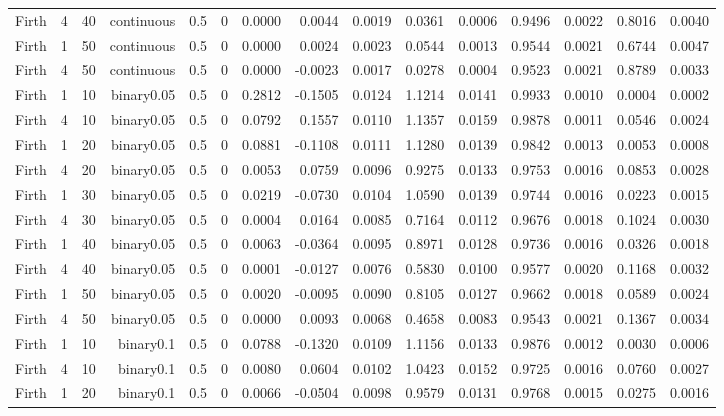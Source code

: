 \begin{longtable}{rrrrrrrrrrrrrrr}
  Firth & 4 & 40 & continuous & 0.5 & 0 & 0.0000 & 0.0044 & 0.0019 & 0.0361 & 0.0006 & 0.9496 & 0.0022 & 0.8016 & 0.0040 \\ 
  Firth & 1 & 50 & continuous & 0.5 & 0 & 0.0000 & 0.0024 & 0.0023 & 0.0544 & 0.0013 & 0.9544 & 0.0021 & 0.6744 & 0.0047 \\ 
  Firth & 4 & 50 & continuous & 0.5 & 0 & 0.0000 & -0.0023 & 0.0017 & 0.0278 & 0.0004 & 0.9523 & 0.0021 & 0.8789 & 0.0033 \\ 
  Firth & 1 & 10 & binary0.05 & 0.5 & 0 & 0.2812 & -0.1505 & 0.0124 & 1.1214 & 0.0141 & 0.9933 & 0.0010 & 0.0004 & 0.0002 \\ 
  Firth & 4 & 10 & binary0.05 & 0.5 & 0 & 0.0792 & 0.1557 & 0.0110 & 1.1357 & 0.0159 & 0.9878 & 0.0011 & 0.0546 & 0.0024 \\ 
  Firth & 1 & 20 & binary0.05 & 0.5 & 0 & 0.0881 & -0.1108 & 0.0111 & 1.1280 & 0.0139 & 0.9842 & 0.0013 & 0.0053 & 0.0008 \\ 
  Firth & 4 & 20 & binary0.05 & 0.5 & 0 & 0.0053 & 0.0759 & 0.0096 & 0.9275 & 0.0133 & 0.9753 & 0.0016 & 0.0853 & 0.0028 \\ 
  Firth & 1 & 30 & binary0.05 & 0.5 & 0 & 0.0219 & -0.0730 & 0.0104 & 1.0590 & 0.0139 & 0.9744 & 0.0016 & 0.0223 & 0.0015 \\ 
  Firth & 4 & 30 & binary0.05 & 0.5 & 0 & 0.0004 & 0.0164 & 0.0085 & 0.7164 & 0.0112 & 0.9676 & 0.0018 & 0.1024 & 0.0030 \\ 
  Firth & 1 & 40 & binary0.05 & 0.5 & 0 & 0.0063 & -0.0364 & 0.0095 & 0.8971 & 0.0128 & 0.9736 & 0.0016 & 0.0326 & 0.0018 \\ 
  Firth & 4 & 40 & binary0.05 & 0.5 & 0 & 0.0001 & -0.0127 & 0.0076 & 0.5830 & 0.0100 & 0.9577 & 0.0020 & 0.1168 & 0.0032 \\ 
  Firth & 1 & 50 & binary0.05 & 0.5 & 0 & 0.0020 & -0.0095 & 0.0090 & 0.8105 & 0.0127 & 0.9662 & 0.0018 & 0.0589 & 0.0024 \\ 
  Firth & 4 & 50 & binary0.05 & 0.5 & 0 & 0.0000 & 0.0093 & 0.0068 & 0.4658 & 0.0083 & 0.9543 & 0.0021 & 0.1367 & 0.0034 \\ 
  Firth & 1 & 10 & binary0.1 & 0.5 & 0 & 0.0788 & -0.1320 & 0.0109 & 1.1156 & 0.0133 & 0.9876 & 0.0012 & 0.0030 & 0.0006 \\ 
  Firth & 4 & 10 & binary0.1 & 0.5 & 0 & 0.0080 & 0.0604 & 0.0102 & 1.0423 & 0.0152 & 0.9725 & 0.0016 & 0.0760 & 0.0027 \\ 
  Firth & 1 & 20 & binary0.1 & 0.5 & 0 & 0.0066 & -0.0504 & 0.0098 & 0.9579 & 0.0131 & 0.9768 & 0.0015 & 0.0275 & 0.0016 \\ 

\end{longtable}
